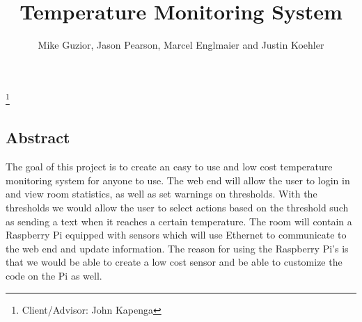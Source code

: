 \documentclass{report}
\begin{document}
\title{Temperature Monitoring System}
\author{Mike Guzior, Jason Pearson, Marcel Englmaier and Justin Koehler}
\thanks{Client/Advisor: John Kapenga}
\maketitle
\tableofcontents
\newpage
\subsection*{Abstract}
The goal of this project is to create an easy to use and low cost temperature monitoring system for anyone to use. 
The web end will allow the user to login in and view room statistics, as well as set warnings on thresholds. 
With the thresholds we would allow the user to select actions based on the threshold such as sending a text when it reaches a certain temperature. 
The room will contain a Raspberry Pi equipped with sensors which will use Ethernet to communicate to the web end and update information. 
The reason for using the Raspberry Pi’s is that we would be able to create a low cost sensor and be able to customize the code on the Pi as well. 
\newpage
\end{document}
